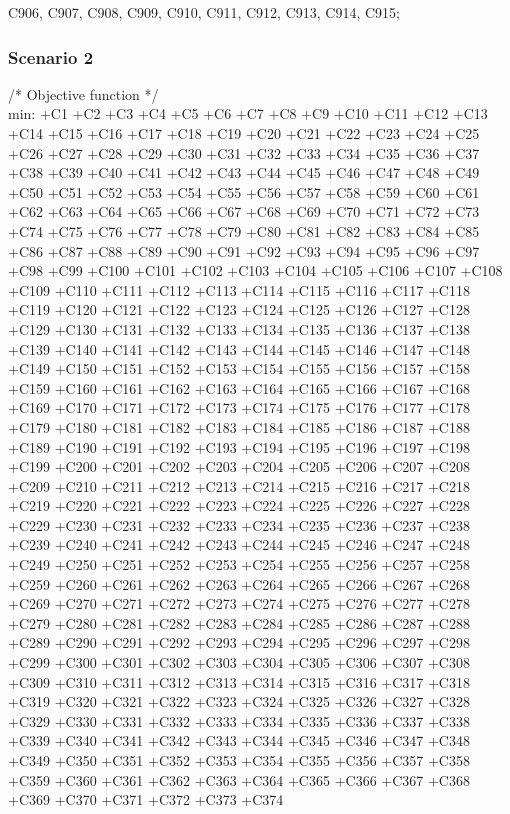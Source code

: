 C906, C907, C908, C909, C910, C911, C912, C913, C914, C915; \\

\subsubsection{Scenario 2}

/* Objective function */ \\
min: +C1 +C2 +C3 +C4 +C5 +C6 +C7 +C8 +C9 +C10 +C11 +C12 +C13 +C14 +C15 +C16 +C17 +C18 +C19 +C20 +C21 +C22
 +C23 +C24 +C25 +C26 +C27 +C28 +C29 +C30 +C31 +C32 +C33 +C34 +C35 +C36 +C37 +C38 +C39 +C40 +C41 +C42
 +C43 +C44 +C45 +C46 +C47 +C48 +C49 +C50 +C51 +C52 +C53 +C54 +C55 +C56 +C57 +C58 +C59 +C60 +C61 +C62
 +C63 +C64 +C65 +C66 +C67 +C68 +C69 +C70 +C71 +C72 +C73 +C74 +C75 +C76 +C77 +C78 +C79 +C80 +C81 +C82
 +C83 +C84 +C85 +C86 +C87 +C88 +C89 +C90 +C91 +C92 +C93 +C94 +C95 +C96 +C97 +C98 +C99 +C100 +C101 +C102
 +C103 +C104 +C105 +C106 +C107 +C108 +C109 +C110 +C111 +C112 +C113 +C114 +C115 +C116 +C117 +C118 +C119
 +C120 +C121 +C122 +C123 +C124 +C125 +C126 +C127 +C128 +C129 +C130 +C131 +C132 +C133 +C134 +C135 +C136
 +C137 +C138 +C139 +C140 +C141 +C142 +C143 +C144 +C145 +C146 +C147 +C148 +C149 +C150 +C151 +C152 +C153
 +C154 +C155 +C156 +C157 +C158 +C159 +C160 +C161 +C162 +C163 +C164 +C165 +C166 +C167 +C168 +C169 +C170
 +C171 +C172 +C173 +C174 +C175 +C176 +C177 +C178 +C179 +C180 +C181 +C182 +C183 +C184 +C185 +C186 +C187
 +C188 +C189 +C190 +C191 +C192 +C193 +C194 +C195 +C196 +C197 +C198 +C199 +C200 +C201 +C202 +C203 +C204
 +C205 +C206 +C207 +C208 +C209 +C210 +C211 +C212 +C213 +C214 +C215 +C216 +C217 +C218 +C219 +C220 +C221
 +C222 +C223 +C224 +C225 +C226 +C227 +C228 +C229 +C230 +C231 +C232 +C233 +C234 +C235 +C236 +C237 +C238
 +C239 +C240 +C241 +C242 +C243 +C244 +C245 +C246 +C247 +C248 +C249 +C250 +C251 +C252 +C253 +C254 +C255
 +C256 +C257 +C258 +C259 +C260 +C261 +C262 +C263 +C264 +C265 +C266 +C267 +C268 +C269 +C270 +C271 +C272
 +C273 +C274 +C275 +C276 +C277 +C278 +C279 +C280 +C281 +C282 +C283 +C284 +C285 +C286 +C287 +C288 +C289
 +C290 +C291 +C292 +C293 +C294 +C295 +C296 +C297 +C298 +C299 +C300 +C301 +C302 +C303 +C304 +C305 +C306
 +C307 +C308 +C309 +C310 +C311 +C312 +C313 +C314 +C315 +C316 +C317 +C318 +C319 +C320 +C321 +C322 +C323
 +C324 +C325 +C326 +C327 +C328 +C329 +C330 +C331 +C332 +C333 +C334 +C335 +C336 +C337 +C338 +C339 +C340
 +C341 +C342 +C343 +C344 +C345 +C346 +C347 +C348 +C349 +C350 +C351 +C352 +C353 +C354 +C355 +C356 +C357
 +C358 +C359 +C360 +C361 +C362 +C363 +C364 +C365 +C366 +C367 +C368 +C369 +C370 +C371 +C372 +C373 +C374
